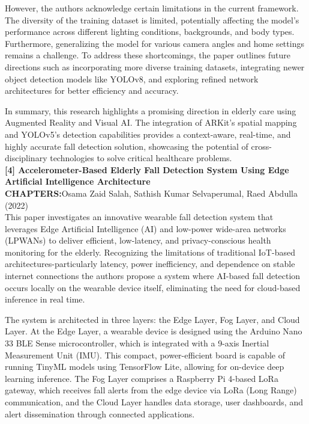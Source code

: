 \documentclass[a4paper, 12pt]{report}
\begin{document}
However, the authors acknowledge certain limitations in the current framework. The diversity of the training dataset is limited, potentially affecting the model's performance across different lighting conditions, backgrounds, and body types. Furthermore, generalizing the model for various camera angles and home settings remains a challenge. To address these shortcomings, the paper outlines future directions such as incorporating more diverse training datasets, integrating newer object detection models like YOLOv8, and exploring refined network architectures for better efficiency and accuracy.

In summary, this research highlights a promising direction in elderly care using Augmented Reality and Visual AI. The integration of ARKit’s spatial mapping and YOLOv5’s detection capabilities provides a context-aware, real-time, and highly accurate fall detection solution, showcasing the potential of cross-disciplinary technologies to solve critical healthcare problems.\\
\noindent\textbf{[4] Accelerometer-Based Elderly Fall Detection System Using Edge Artificial Intelligence Architecture}\\
\textbf{CHAPTERS:}Osama Zaid Salah, Sathish Kumar Selvaperumal, Raed Abdulla (2022)\\
This paper investigates an innovative wearable fall detection system that leverages Edge Artificial Intelligence (AI) and low-power wide-area networks (LPWANs) to deliver efficient, low-latency, and privacy-conscious health monitoring for the elderly. Recognizing the limitations of traditional IoT-based architectures-particularly latency, power inefficiency, and dependence on stable internet connections the authors propose a system where AI-based fall detection occurs locally on the wearable device itself, eliminating the need for cloud-based inference in real time.

The system is architected in three layers: the Edge Layer, Fog Layer, and Cloud Layer. At the Edge Layer, a wearable device is designed using the Arduino Nano 33 BLE Sense microcontroller, which is integrated with a 9-axis Inertial Measurement Unit (IMU). This compact, power-efficient board is capable of running TinyML models using TensorFlow Lite, allowing for on-device deep learning inference. The Fog Layer comprises a Raspberry Pi 4-based LoRa gateway, which receives fall alerts from the edge device via LoRa (Long Range) communication, and the Cloud Layer handles data storage, user dashboards, and alert dissemination through connected applications.
\end{document}

